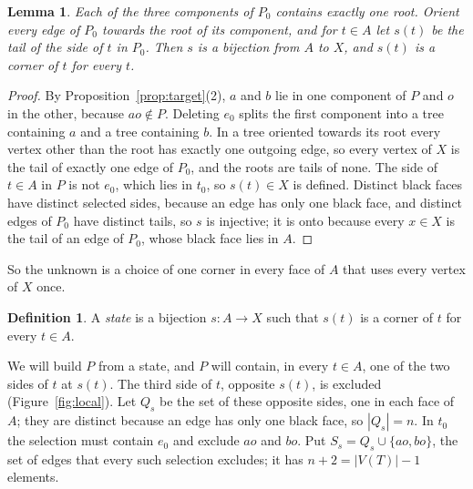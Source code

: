 \documentclass[10pt]{amsart}
\numberwithin{equation}{section}
\newtheorem{lemma}[equation]{Lemma}
\theoremstyle{definition}
\newtheorem{definition}[equation]{Definition}
\theoremstyle{remark}
\newcommand{\T}{T}
\begin{document}
\begin{lemma}\label{lem:selections-give-states}
Each of the three components of $P_0$ contains exactly one root.
Orient every edge of $P_0$ towards the root of its component, and for $t\in A$ let $s(t)$ be the tail of the side of $t$ in $P_0$.
Then $s$ is a bijection from $A$ to $X$, and $s(t)$ is a corner of $t$ for every $t$.
\end{lemma}

\begin{proof}
By Proposition~\ref{prop:target}(2), $a$ and $b$ lie in one component of $P$ and $o$ in the other, because $ao\notin P$.
Deleting $e_0$ splits the first component into a tree containing $a$ and a tree containing $b$.
In a tree oriented towards its root every vertex other than the root has exactly one outgoing edge, so every vertex of $X$ is the tail of exactly one edge of $P_0$, and the roots are tails of none.
The side of $t\in A$ in $P$ is not $e_0$, which lies in $t_0$, so $s(t)\in X$ is defined.
Distinct black faces have distinct selected sides, because an edge has only one black face, and distinct edges of $P_0$ have distinct tails, so $s$ is injective; it is onto because every $x\in X$ is the tail of an edge of $P_0$, whose black face lies in $A$.
\end{proof}

So the unknown is a choice of one corner in every face of $A$ that uses every vertex of $X$ once.

\begin{definition}
A \emph{state} is a bijection $s\colon A\to X$ such that $s(t)$ is a corner of $t$ for every $t\in A$.
\end{definition}

We will build $P$ from a state, and $P$ will contain, in every $t\in A$, one of the two sides of $t$ at $s(t)$.
The third side of $t$, opposite $s(t)$, is excluded (Figure~\ref{fig:local}).
Let $Q_s$ be the set of these opposite sides, one in each face of $A$; they are distinct because an edge has only one black face, so $|Q_s|=n$.
In $t_0$ the selection must contain $e_0$ and exclude $ao$ and $bo$.
Put $S_s=Q_s\cup\{ao,bo\}$, the set of edges that every such selection excludes; it has $n+2=|V(\T)|-1$ elements.
\end{document}

